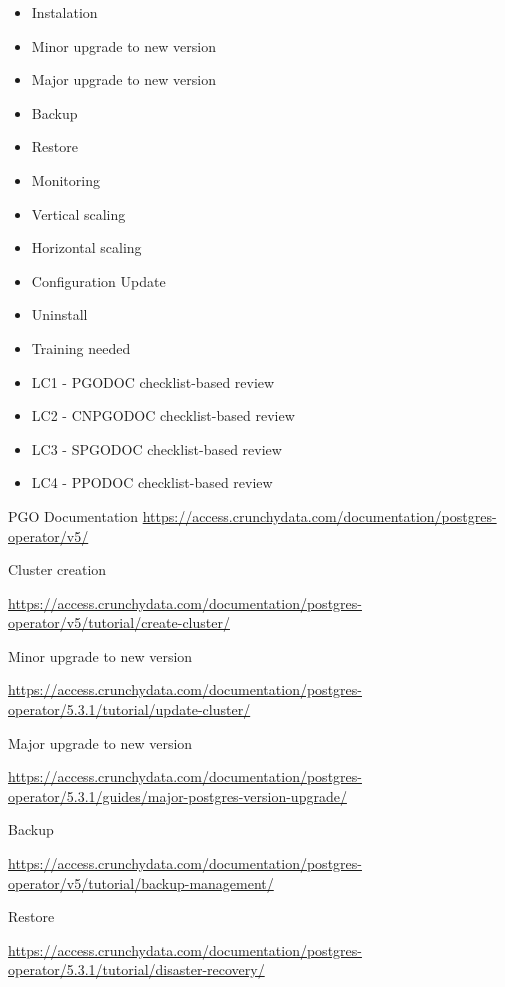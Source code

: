 \begin{itemize}
    \item Instalation
    \item Minor upgrade to new version
    \item Major upgrade to new version
    \item Backup
    \item Restore
    \item Monitoring
    \item Vertical scaling
    \item Horizontal scaling
    \item Configuration Update
    \item Uninstall
    \item Training needed
\end{itemize}

\begin{itemize}
    \item LC1 - PGODOC checklist-based review
    \item LC2 - CNPGODOC checklist-based review
    \item LC3 - SPGODOC checklist-based review
    \item LC4 - PPODOC checklist-based review
\end{itemize}



PGO
Documentation
\sloppy
\url{https://access.crunchydata.com/documentation/postgres-operator/v5/}

Cluster creation

\url{https://access.crunchydata.com/documentation/postgres-operator/v5/tutorial/create-cluster/}

Minor upgrade to new version

\url{https://access.crunchydata.com/documentation/postgres-operator/5.3.1/tutorial/update-cluster/}

Major upgrade to new version

\url{https://access.crunchydata.com/documentation/postgres-operator/5.3.1/guides/major-postgres-version-upgrade/}

Backup

\url{https://access.crunchydata.com/documentation/postgres-operator/v5/tutorial/backup-management/}

Restore

\url{https://access.crunchydata.com/documentation/postgres-operator/5.3.1/tutorial/disaster-recovery/}

